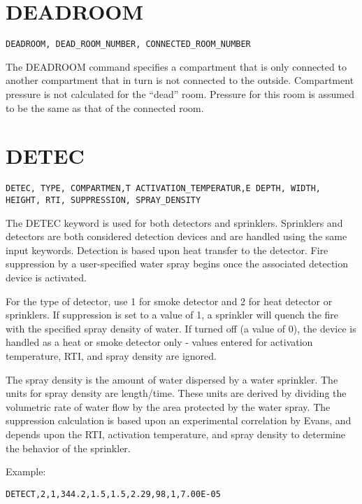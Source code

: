 \section{DEADROOM}

\begin{lstlisting}
DEADROOM, DEAD_ROOM_NUMBER, CONNECTED_ROOM_NUMBER
\end{lstlisting}

The DEADROOM command specifies a compartment that is only connected to another compartment that in turn is not connected to the outside.  Compartment pressure is not calculated for the ``dead'' room. Pressure for this room is assumed to be the same as that of the connected room.

\section{DETEC}

\begin{lstlisting}
DETEC, TYPE, COMPARTMEN,T ACTIVATION_TEMPERATUR,E DEPTH, WIDTH, HEIGHT, RTI, SUPPRESSION, SPRAY_DENSITY
\end{lstlisting}

The DETEC keyword is used for both detectors and sprinklers. Sprinklers and detectors are both considered detection devices and are handled using the same input keywords.  Detection is based upon heat transfer to the detector. Fire suppression by a user-specified water spray begins once the associated detection device is activated.

For the type of detector, use 1 for smoke detector and 2 for heat detector or sprinklers. If suppression is set to a value of 1, a sprinkler will quench the fire with the specified spray density of water. If turned off (a value of 0), the device is handled as a heat or smoke detector only - values entered for activation temperature, RTI, and spray density are ignored. 

The spray density is the amount of water dispersed by a water sprinkler.  The units for spray density are length/time.  These units are derived by dividing the volumetric rate of water flow by the area protected by the water spray. The suppression calculation is based upon an experimental correlation by Evans, and depends upon the RTI, activation temperature, and spray density to determine the behavior of the sprinkler.

Example:

\begin{lstlisting}
DETECT,2,1,344.2,1.5,1.5,2.29,98,1,7.00E-05
\end{lstlisting}

